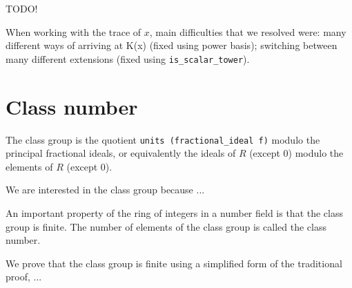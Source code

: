 \documentclass{lipics-v2021}
\newcommand{\lean}[1]{\texttt{#1}\xspace} %
\begin{document}
TODO!

When working with the trace of $x$, main difficulties that we resolved were: many different ways of arriving at K(x) (fixed using power basis); switching between many different extensions (fixed using \lean{is\_scalar\_tower}).

\section{Class number}

The class group is the quotient \lean{units (fractional\_ideal f)} modulo the principal fractional ideals, or equivalently the ideals of $R$ (except $0$) modulo the elements of $R$ (except $0$).

We are interested in the class group because ...

An important property of the ring of integers in a number field is that the class group is finite. The number of elements of the class group is called the class number.

We prove that the class group is finite using a simplified form of the traditional proof, ...
\end{document}
